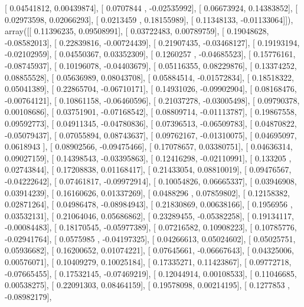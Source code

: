 \documentclass{article}
\begin{document}
       [ 0.04541812,  0.00439874],
       [ 0.0707844 , -0.02535992],
       [ 0.06673924,  0.14383852],
       [ 0.02973598,  0.02066293],
       [ 0.0213459 ,  0.18155989],
       [ 0.11348133, -0.01133064]]), array([[ 0.11396235,  0.09508991],
       [ 0.03722483,  0.00789759],
       [ 0.19048628, -0.08582013],
       [ 0.22839816, -0.00724439],
       [ 0.21907435, -0.03468127],
       [ 0.19193194, -0.02102959],
       [ 0.04550367,  0.03352309],
       [ 0.1260257 , -0.04685523],
       [ 0.15776161, -0.08745937],
       [ 0.10196078, -0.04403679],
       [ 0.05116355,  0.08229876],
       [ 0.13374252,  0.08855528],
       [ 0.05636989,  0.08043708],
       [ 0.05884514, -0.01572834],
       [ 0.18518322,  0.05041389],
       [ 0.22865704, -0.06710171],
       [ 0.14931026, -0.09902904],
       [ 0.08168476, -0.00764121],
       [ 0.10861158, -0.06460596],
       [ 0.21037278, -0.03005498],
       [ 0.09790378,  0.00108686],
       [ 0.03751901, -0.07168542],
       [ 0.08809714, -0.01113787],
       [ 0.19867558,  0.09592773],
       [ 0.04911345, -0.04780836],
       [ 0.07396513, -0.06509783],
       [ 0.04870822, -0.05079437],
       [ 0.07055894,  0.08743637],
       [ 0.09762167, -0.01310075],
       [ 0.04695097,  0.0618943 ],
       [ 0.08902566, -0.09475466],
       [ 0.17078657,  0.03380751],
       [ 0.04636314,  0.09027159],
       [ 0.14398543, -0.03395863],
       [ 0.12416298, -0.02110991],
       [ 0.133205  ,  0.02743844],
       [ 0.17208838,  0.01168417],
       [ 0.21433054,  0.08810019],
       [ 0.09476567, -0.04222642],
       [ 0.07461817, -0.09972914],
       [ 0.10054826,  0.06665337],
       [ 0.03946908,  0.03914239],
       [ 0.16160626,  0.01337269],
       [ 0.0488296 ,  0.07859802],
       [ 0.12158382,  0.02871264],
       [ 0.04986478, -0.08984943],
       [ 0.21830869,  0.00638166],
       [ 0.1956956 ,  0.03532131],
       [ 0.21064046,  0.05686862],
       [ 0.23289455, -0.05382258],
       [ 0.19134117, -0.00084483],
       [ 0.18170545, -0.05977389],
       [ 0.07216582,  0.10908223],
       [ 0.10785776, -0.02941764],
       [ 0.0575985 , -0.04197325],
       [ 0.04266613,  0.05024602],
       [ 0.05025751,  0.05936682],
       [ 0.16200652,  0.01074221],
       [ 0.07645661, -0.06667643],
       [ 0.04325006,  0.00576071],
       [ 0.10409279,  0.10025184],
       [ 0.17335271,  0.11423867],
       [ 0.09772718, -0.07665455],
       [ 0.17532145, -0.07469219],
       [ 0.12044914,  0.00108533],
       [ 0.11046685,  0.00538275],
       [ 0.22091303,  0.08464159],
       [ 0.19578098,  0.00214195],
       [ 0.1277853 , -0.08982179],
\end{document}
